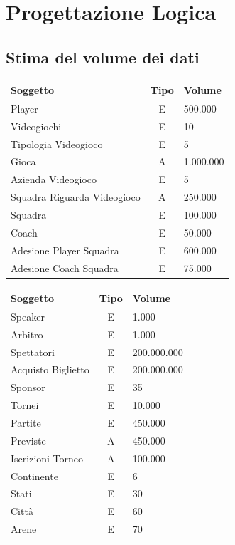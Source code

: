 \documentclass[a4paper,12pt]{report}
\begin{document}
\chapter{Progettazione Logica}
\section{Stima del volume dei dati}
\renewcommand{\arraystretch}{1.5} %
\setlength{\arrayrulewidth}{0.5mm}%
\setlength{\tabcolsep}{10pt}%
\setlength\doublerulesep{0.15cm}%

\begin{tabular}{|m{2cm}|c|m{2cm}|}
	\hline\rowcolor{pink}
	Soggetto & Tipo & Volume\\
	\hline\hline
	
	Player & E & 500.000\\
	\hline
	Videogiochi & E & 10\\
	\hline
	Tipologia Videogioco & E & 5\\
	\hline
	Gioca & A & 1.000.000\\
	\hline
	Azienda Videogioco & E & 5\\
	\hline
	 Squadra Riguarda Videogioco & A & 250.000\\
	
	\hline
	\hline
	
	Squadra & E & 100.000\\
	\hline
	Coach & E & 50.000\\
	\hline
	Adesione Player Squadra& E & 600.000\\ 
	\hline
	Adesione Coach Squadra& E & 75.000\\ 
	
	\hline
\end{tabular}
\setlength\doublerulesep{0.28cm} %
\begin{tabular}{|m{2cm}|c|m{2cm}|}
	\hline\rowcolor{pink}
	Soggetto & Tipo & Volume\\
	\hline\hline
	Speaker & E & 1.000\\
	\hline
	Arbitro & E & 1.000\\
	\hline
	Spettatori & E & 200.000.000\\
	\hline
	Acquisto Biglietto & E & 200.000.000\\ 
	\hline
	Sponsor & E & 35\\
	
	\hline\hline
	
	Tornei & E & 10.000\\
	\hline
	Partite & E & 450.000\\
	\hline
	Previste & A & 450.000\\ 
	\hline
	Iscrizioni Torneo & A & 100.000\\ 
	\hline
	
	\hline\hline
	
	Continente & E & 6\\
	\hline
	Stati & E & 30\\
	\hline
	Città & E & 60\\ 
	\hline
	Arene & E & 70\\ 
	\hline
	
	
\end{tabular}
\end{document}
